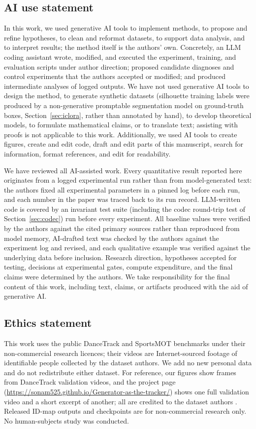 \documentclass{article} %
\begin{document}
\subsection*{AI use statement}

In this work, we used generative AI tools to implement methods, to propose and refine
hypotheses, to clean and reformat datasets, to support data analysis, and to interpret
results; the method itself is the authors' own. Concretely, an LLM coding assistant wrote,
modified, and executed the experiment, training, and evaluation scripts under author
direction; proposed candidate diagnoses and control experiments that the authors accepted
or modified; and produced intermediate analyses of logged outputs. We have not used
generative AI tools to design the method, to generate synthetic datasets (silhouette
training labels were produced by a non-generative promptable segmentation model on
ground-truth boxes, Section~\ref{sec:iclora}, rather than annotated by hand), to develop
theoretical models, to formulate mathematical claims, or to translate text; assisting with
proofs is not applicable to this work. Additionally, we used AI tools to create figures,
create and edit code, draft and edit parts of this manuscript, search for information,
format references, and edit for readability.

We have reviewed all AI-assisted work. Every quantitative result reported here originates
from a logged experimental run rather than from model-generated text: the authors fixed
all experimental parameters in a pinned log before each run, and each number in the paper
was traced back to its run record. LLM-written code is covered by an invariant test suite
(including the codec round-trip test of Section~\ref{sec:codec}) run before every
experiment. All baseline values were verified by the authors against the cited primary
sources rather than reproduced from model memory, AI-drafted text was checked by the
authors against the experiment log and revised, and each qualitative example was verified
against the underlying data before inclusion. Research direction, hypotheses accepted for
testing, decisions at experimental gates, compute expenditure, and the final claims were
determined by the authors. We take responsibility for the final content of this work,
including text, claims, or artifacts produced with the aid of generative AI.

\subsection*{Ethics statement}
This work uses the public DanceTrack and SportsMOT benchmarks under their non-commercial
research licences; their videos are Internet-sourced footage of identifiable people
collected by the dataset authors. We add no new personal data and do not redistribute
either dataset. For reference, our figures show frames from DanceTrack validation videos,
and the project page (\url{https://sonam525.github.io/Generator-as-the-tracker/}) shows one full validation video and a short excerpt
of another; all are credited to the dataset authors \citep{sun2022dancetrack}. Released ID-map outputs and checkpoints are for non-commercial research only. No
human-subjects study was conducted.
\end{document}
